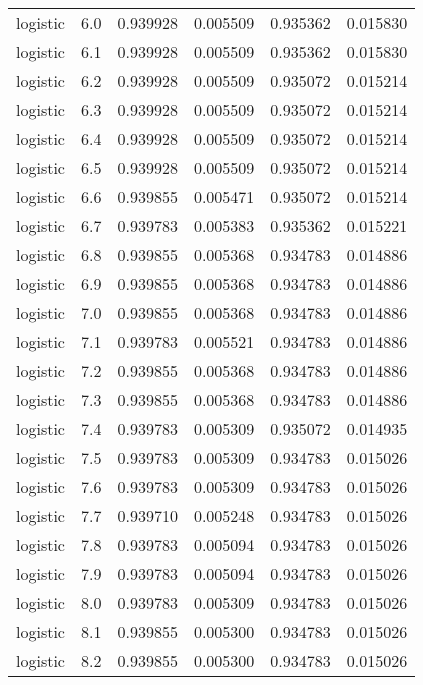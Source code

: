 \begin{tabular}{lrrrrr}
logistic &        6.0 &    0.939928 &   0.005509 &   0.935362 &  0.015830 \\
logistic &        6.1 &    0.939928 &   0.005509 &   0.935362 &  0.015830 \\
logistic &        6.2 &    0.939928 &   0.005509 &   0.935072 &  0.015214 \\
logistic &        6.3 &    0.939928 &   0.005509 &   0.935072 &  0.015214 \\
logistic &        6.4 &    0.939928 &   0.005509 &   0.935072 &  0.015214 \\
logistic &        6.5 &    0.939928 &   0.005509 &   0.935072 &  0.015214 \\
logistic &        6.6 &    0.939855 &   0.005471 &   0.935072 &  0.015214 \\
logistic &        6.7 &    0.939783 &   0.005383 &   0.935362 &  0.015221 \\
logistic &        6.8 &    0.939855 &   0.005368 &   0.934783 &  0.014886 \\
logistic &        6.9 &    0.939855 &   0.005368 &   0.934783 &  0.014886 \\
logistic &        7.0 &    0.939855 &   0.005368 &   0.934783 &  0.014886 \\
logistic &        7.1 &    0.939783 &   0.005521 &   0.934783 &  0.014886 \\
logistic &        7.2 &    0.939855 &   0.005368 &   0.934783 &  0.014886 \\
logistic &        7.3 &    0.939855 &   0.005368 &   0.934783 &  0.014886 \\
logistic &        7.4 &    0.939783 &   0.005309 &   0.935072 &  0.014935 \\
logistic &        7.5 &    0.939783 &   0.005309 &   0.934783 &  0.015026 \\
logistic &        7.6 &    0.939783 &   0.005309 &   0.934783 &  0.015026 \\
logistic &        7.7 &    0.939710 &   0.005248 &   0.934783 &  0.015026 \\
logistic &        7.8 &    0.939783 &   0.005094 &   0.934783 &  0.015026 \\
logistic &        7.9 &    0.939783 &   0.005094 &   0.934783 &  0.015026 \\
logistic &        8.0 &    0.939783 &   0.005309 &   0.934783 &  0.015026 \\
logistic &        8.1 &    0.939855 &   0.005300 &   0.934783 &  0.015026 \\
logistic &        8.2 &    0.939855 &   0.005300 &   0.934783 &  0.015026 \\

\end{tabular}
